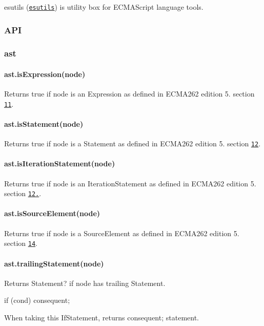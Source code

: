esutils (\href{http://github.com/estools/esutils}{\tt esutils}) is utility box for E\+C\+M\+A\+Script language tools.

\subsubsection*{A\+PI}

\subsubsection*{ast}

\paragraph*{ast.\+is\+Expression(node)}

Returns true if {\ttfamily node} is an Expression as defined in E\+C\+M\+A262 edition 5. section \href{https://es5.github.io/#x11}{\tt 11}.

\paragraph*{ast.\+is\+Statement(node)}

Returns true if {\ttfamily node} is a Statement as defined in E\+C\+M\+A262 edition 5. section \href{https://es5.github.io/#x12}{\tt 12}.

\paragraph*{ast.\+is\+Iteration\+Statement(node)}

Returns true if {\ttfamily node} is an Iteration\+Statement as defined in E\+C\+M\+A262 edition 5. section \href{https://es5.github.io/#x12.6}{\tt 12.}.

\paragraph*{ast.\+is\+Source\+Element(node)}

Returns true if {\ttfamily node} is a Source\+Element as defined in E\+C\+M\+A262 edition 5. section \href{https://es5.github.io/#x14}{\tt 14}.

\paragraph*{ast.\+trailing\+Statement(node)}

Returns {\ttfamily Statement?} if {\ttfamily node} has trailing {\ttfamily Statement}. 
\begin{DoxyCode}
if (cond)
    consequent;
\end{DoxyCode}
 When taking this {\ttfamily If\+Statement}, returns {\ttfamily consequent;} statement.


